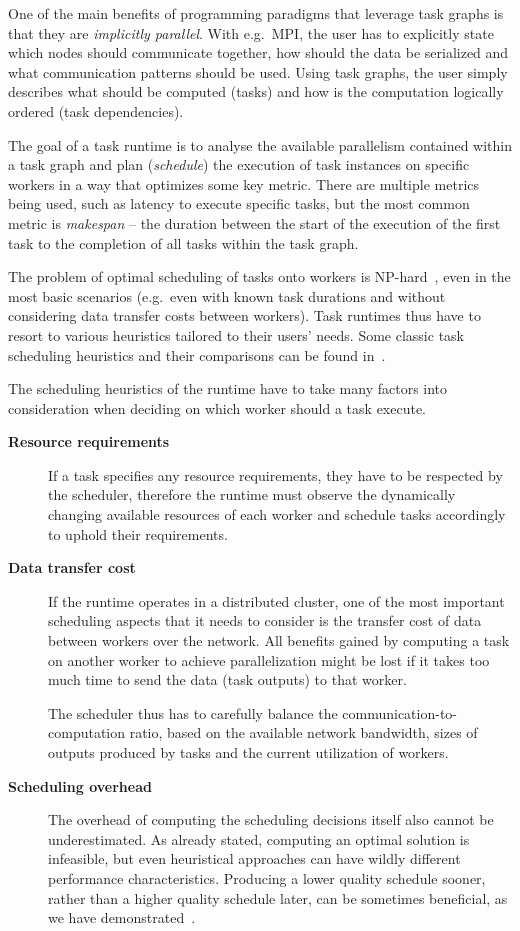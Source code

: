 One of the main benefits of programming paradigms that leverage task graphs is that they are
\emph{implicitly parallel}. With e.g.\ MPI, the user has to explicitly state which nodes should
communicate together, how should the data be serialized and what communication patterns should
be used. Using task graphs, the user simply describes what should be computed (tasks) and how is
the computation logically ordered (task dependencies).

The goal of a task runtime is to analyse the available parallelism contained within a task graph
and plan (\emph{schedule}) the execution of task instances on specific workers in a way that
optimizes some key metric. There are multiple metrics being used, such as latency to execute
specific tasks, but the most common metric is \emph{makespan} -- the duration between the start of
the execution of the first task to the completion of all tasks within the task graph.

The problem of optimal scheduling of tasks onto workers is NP-hard~\cite{Ullman1975}, even in
the most basic scenarios (e.g.\ even with known task durations and without considering
data transfer costs between workers). Task runtimes thus have to resort to various
heuristics tailored to their users' needs. Some classic task scheduling heuristics and their
comparisons can be found in~\cite{hlfet1974,kwok1998benchmarking,hagras2003static,wang2018list}.

The scheduling heuristics of the runtime have to take many factors into consideration when
deciding on which worker should a task execute.

\begin{description}
    \item[\textbf{Resource requirements}] If a task specifies any resource requirements, they
    have to be respected by the scheduler, therefore the runtime must observe the
    dynamically changing available resources of each worker and schedule tasks accordingly to
    uphold their requirements.
    \item[\textbf{Data transfer cost}] If the runtime operates in a distributed cluster, one of
    the most important scheduling aspects that it needs to consider is the transfer cost of data
    between workers over the network. All benefits gained by computing a task on another worker to
    achieve parallelization might be lost if it takes too much time to send the data (task
    outputs) to that worker.

    The scheduler thus has to carefully balance the communication-to-computation ratio, based on
    the available network bandwidth, sizes of outputs produced by tasks and the current utilization
    of workers.
    \item[\textbf{Scheduling overhead}] The overhead of computing the scheduling decisions
    itself also cannot be underestimated. As already stated, computing an optimal solution is
    infeasible, but even heuristical approaches can have wildly different performance
    characteristics. Producing a lower quality schedule sooner, rather than a higher quality
    schedule later, can be sometimes beneficial, as we have demonstrated~\cite{rsds}.
\end{description}
